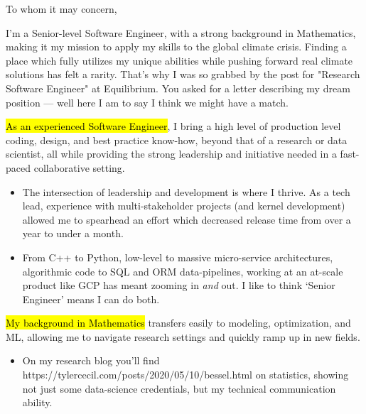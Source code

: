 \documentclass{tc_cv}
\begin{document}

\begin{adjustwidth}{38pt}{38pt}
  \large

  To whom it may concern,\par \medbreak

  \medbreak

  I'm a Senior-level Software Engineer, with a strong background in
  Mathematics, making it my mission to apply my skills to the global climate
  crisis. Finding a place which fully utilizes my unique abilities while
  pushing forward real climate solutions has felt a rarity. That's why I was so
  grabbed by the post for "Research Software Engineer" at Equilibrium. You
  asked for a letter describing my dream position --- well here I am to say I
  think we might have a match. \medbreak

  \hl{As an experienced Software Engineer}, I bring a high level of production
  level coding, design, and best practice know-how, beyond that of a research
  or data scientist, all while providing the strong leadership and initiative
  needed in a fast-paced collaborative setting.
  \begin{itemize}

    \item The intersection of leadership and development is where I thrive. As
      a tech lead, experience with multi-stakeholder projects (and kernel
      development) allowed me to spearhead an effort which decreased release
      time from over a year to under a month.

    \item From C++ to Python, low-level to massive micro-service architectures,
      algorithmic code to SQL and ORM data-pipelines, working at an at-scale
      product like GCP has meant zooming in \emph{and} out. I like to think
      `Senior Engineer' means I can do both.
  \end{itemize} \medbreak

  \hl{My background in Mathematics} transfers easily to modeling, optimization,
  and ML, allowing me to navigate research settings and quickly ramp up in new
  fields.
  \begin{itemize}

    \item On my research blog you'll find \cite{Jupyter
      notebooks}{https://tylercecil.com/posts/2020/05/10/bessel.html} on
      statistics, showing not just some data-science credentials, but my
      technical communication ability.


\end{itemize}
\end{adjustwidth}
\end{document}
